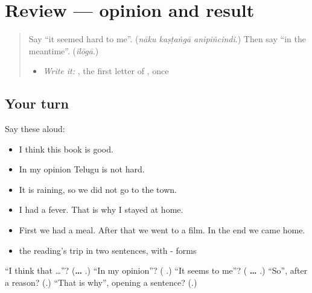 \section[(review)]{Review — opinion and result}

\label{lesson:TE-R318-opinion-and-result}



\begin{quote}
Say \textquotedblleft{}it seemed hard to me\textquotedblright{}. (\emph{nāku kaṣṭaṅgā anipiñcindi}.) Then say \textquotedblleft{}in the meantime\textquotedblright{}. (\emph{īlōgā}.)

\begin{itemize}
\raggedright
  \item \emph{Write it:} \textbf{}, the first letter of \textbf{}, once
\end{itemize}
\end{quote}

\subsection*{Your turn}
Say these aloud:

\begin{itemize}
\raggedright
  \item I think this book is good.
  \item In my opinion Telugu is not hard.
  \item It is raining, so we did not go to the town.
  \item I had a fever. That is why I stayed at home.
  \item First we had a meal. After that we went to a film. In the end we came home.
  \item the reading's trip in two sentences, with - forms
\end{itemize}

\begin{tcolorbox}[breakable,colback=teal!4,colframe=teal!35!black,title={Before you move on}]
\textquotedblleft{}I think that …\textquotedblright{}? (\textbf{…  }.) \textquotedblleft{}In my opinion\textquotedblright{}? (\textbf{ }.) \textquotedblleft{}It seems to me\textquotedblright{}? (\textbf{ … }.) \textquotedblleft{}So\textquotedblright{}, after a reason? (\textbf{}.) \textquotedblleft{}That is why\textquotedblright{}, opening a sentence? (\textbf{}.)
\end{tcolorbox}
